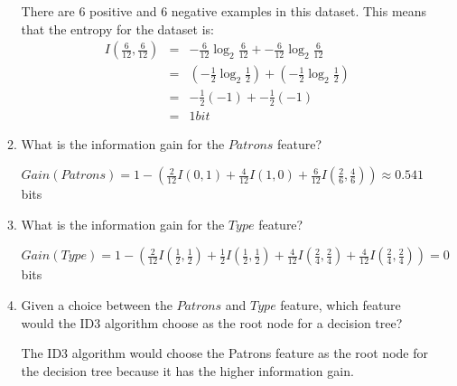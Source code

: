 \documentclass[solution]{ditpaper}
\begin{document}
\begin{enumerate}
\begin{enumerate}
			\begin{answer}
					There are 6 positive and 6 negative examples in this dataset. This means that the entropy for the dataset is:
					\begin{eqnarray*}
						I(\frac{6}{12}, \frac{6}{12}) &=& -\frac{6}{12}\log_2\frac{6}{12} + -\frac{6}{12}\log_2 \frac{6}{12}\\
									~ &=& (-\frac{1}{2}\log_2\frac{1}{2}) + (-\frac{1}{2}\log_2\frac{1}{2}) \\ 
						~ &=&  -\frac{1}{2}(-1) + -\frac{1}{2}(-1) \\
						 ~ &=&  1bit
					\end{eqnarray*}			
			\end{answer}
		\item What is the information gain for the $Patrons$ feature?
			\begin{answer}
							$Gain(Patrons)=1- ( \frac{2}{12}I(0,1) + \frac{4}{12}I(1,0) + \frac{6}{12}I(\frac{2}{6},\frac{4}{6}) ) \approx 0.541$ bits
			\end{answer}
		\item What is the information gain for the $Type$ feature?
			\begin{answer}
							$Gain(Type)=1- ( \frac{2}{12}I(\frac{1}{2},\frac{1}{2}) + \frac{1}{2}I(\frac{1}{2},\frac{1}{2}) + \frac{4}{12}I(\frac{2}{4},\frac{2}{4})+ \frac{4}{12}I(\frac{2}{4},\frac{2}{4}) ) = 0$ bits
			\end{answer}
		\item Given a choice between the $Patrons$ and $Type$ feature, which feature would the ID3 algorithm choose as the root node for a decision tree?
			\begin{answer}
					The ID3 algorithm would choose the Patrons feature as the root node for the decision tree because it has the higher information gain.
			\end{answer}
	\end{enumerate}
\end{enumerate}

\newpage 
\end{document}
